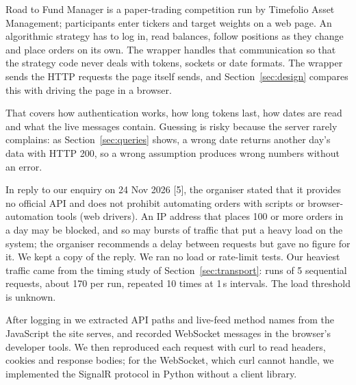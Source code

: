 \seclabel
{}

 Road to Fund Manager is a paper-trading competition run by Timefolio Asset Management; participants enter tickers and target weights on a web page. An algorithmic strategy has to log in, read balances, follow positions as they change and place orders on its own. The wrapper handles that communication so that the strategy code never deals with tokens, sockets or date formats. The wrapper sends the HTTP requests the page itself sends, and Section~\ref{sec:design} compares this with driving the page in a browser.

 That covers how authentication works, how long tokens last, how dates are read and what the live messages contain. Guessing is risky because the server rarely complains: as Section~\ref{sec:queries} shows, a wrong date returns another day's data with HTTP 200, so a wrong assumption produces wrong numbers without an error.

 In reply to our enquiry on 24 Nov 2026 [5], the organiser stated that it provides no official API and does not prohibit automating orders with scripts or browser-automation tools (web drivers). An IP address that places 100 or more orders in a day may be blocked, and so may bursts of traffic that put a heavy load on the system; the organiser recommends a delay between requests but gave no figure for it. We kept a copy of the reply. We ran no load or rate-limit tests. Our heaviest traffic came from the timing study of Section~\ref{sec:transport}: runs of 5 sequential requests, about 170\ms{} per run, repeated 10 times at 1\,s intervals. The load threshold is unknown.

 After logging in we extracted API paths and live-feed method names from the JavaScript the site serves, and recorded WebSocket messages in the browser's developer tools. We then reproduced each request with curl to read headers, cookies and response bodies; for the WebSocket, which curl cannot handle, we implemented the SignalR protocol in Python without a client library.

